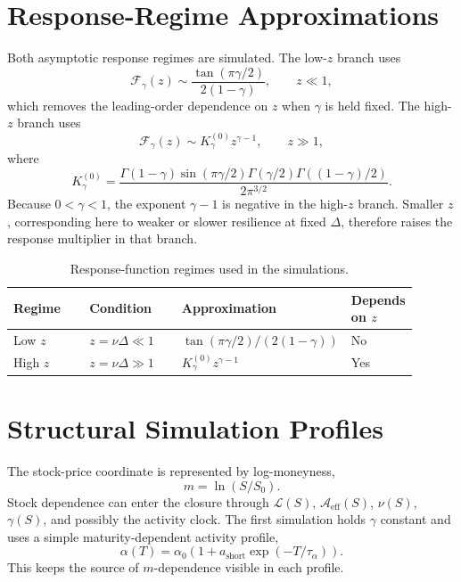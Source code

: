 \documentclass[11pt]{article}
\newcommand{\Aeff}{\mathcal A_{\mathrm{eff}}}
\newcommand{\Liq}{\mathcal L}
\newcommand{\Fresp}{\mathcal F}
\begin{document}
\section{Response-Regime Approximations}

Both asymptotic response regimes are simulated. The low-\(z\) branch uses
\begin{equation}
 \Fresp_\gamma(z)
 \sim
 \frac{\tan(\pi\gamma/2)}{2(1-\gamma)},
 \qquad z\ll1,
 \label{eq:low-z-response}
\end{equation}
which removes the leading-order dependence on \(z\) when \(\gamma\) is held
fixed. The high-\(z\) branch uses
\begin{equation}
 \Fresp_\gamma(z)
 \sim
 K_\gamma^{(0)}z^{\gamma-1},
 \qquad z\gg1,
 \label{eq:high-z-response}
\end{equation}
where
\begin{equation}
 K_\gamma^{(0)}
 =
 \frac{
 \Gamma(1-\gamma)\sin(\pi\gamma/2)
 \Gamma(\gamma/2)\Gamma((1-\gamma)/2)
 }{2\pi^{3/2}}.
 \label{eq:k-gamma}
\end{equation}
Because \(0<\gamma<1\), the exponent \(\gamma-1\) is negative in the
high-\(z\) branch. Smaller \(z\), corresponding here to weaker or slower
resilience at fixed \(\Delta\), therefore raises the response multiplier in
that branch.

\begin{table}[ht]
\centering
\small
\caption{Response-function regimes used in the simulations.}
\label{tab:response-regimes}
\begin{tabular}{p{0.19\linewidth}p{0.23\linewidth}p{0.37\linewidth}p{0.11\linewidth}}
\toprule
Regime & Condition & Approximation & Depends on \(z\) \\
\midrule
Low \(z\) & \(z=\nu\Delta\ll1\) &
\(\tan(\pi\gamma/2)/(2(1-\gamma))\) & No \\
High \(z\) & \(z=\nu\Delta\gg1\) &
\(K_\gamma^{(0)}z^{\gamma-1}\) & Yes \\
\bottomrule
\end{tabular}
\end{table}

\section{Structural Simulation Profiles}

The stock-price coordinate is represented by log-moneyness,
\begin{equation}
 m=\ln(S/S_0).
\end{equation}
Stock dependence can enter the closure through \(\Liq(S)\), \(\Aeff(S)\),
\(\nu(S)\), \(\gamma(S)\), and possibly the activity clock. The first
simulation holds \(\gamma\) constant and uses a simple maturity-dependent
activity profile,
\begin{equation}
 \alpha(T)
 =
 \alpha_0\left(1+a_{\mathrm{short}}\exp(-T/\tau_\alpha)\right).
 \label{eq:activity-profile}
\end{equation}
This keeps the source of \(m\)-dependence visible in each profile.
\end{document}
